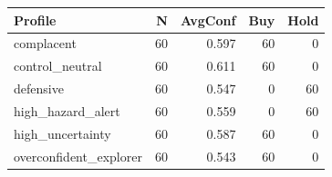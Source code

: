 \begin{tabular}{lrrrr}
\hline
Profile & N & AvgConf & Buy & Hold \\
\hline
complacent & 60 & 0.597 & 60 & 0 \\
control_neutral & 60 & 0.611 & 60 & 0 \\
defensive & 60 & 0.547 & 0 & 60 \\
high_hazard_alert & 60 & 0.559 & 0 & 60 \\
high_uncertainty & 60 & 0.587 & 60 & 0 \\
overconfident_explorer & 60 & 0.543 & 60 & 0 \\
\hline
\end{tabular}

